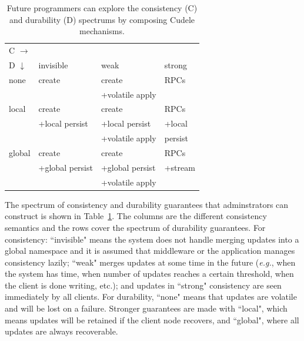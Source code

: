 \begin{table}[t]
\begin{center}
\caption{Future programmers can explore the consistency (C) and
durability (D) spectrums by composing Cudele mechanisms. 
\label{table:spectrum}}
\begin{tabular}{ l | l | l | l }
  C \(\rightarrow\) &&& \\  
  D \(\downarrow\)  	     & invisible         & weak        & strong  \\\hline
  none                       & create            & create          & RPCs    \\
                             &                   & +volatile apply &         \\\hdashline
  local                      & create            & create          & RPCs    \\
                             & +local persist    & +local persist  & +local  \\
                             &                   & +volatile apply &  persist\\\hdashline
  global                     & create            & create          & RPCs    \\
                             & +global persist   & +global persist & +stream \\
                             &                   & +volatile apply &         \\
\end{tabular}
\end{center}
\end{table}

The spectrum of consistency and durability guarantees that adminstrators can
construct is shown in Table~\ref{table:spectrum}. The columns are the different
consistency semantics and the rows cover the spectrum of durability guarantees.
For consistency: ``invisible" means the system does not handle merging updates
into a global namespace and it is assumed that middleware or the application
manages consistency lazily; ``weak" merges updates at some time in the
future ({\it e.g.}, when the system has time, when number of updates reaches a
certain threshold, when the client is done writing, etc.); and updates in
``strong" consistency are seen immediately by all clients. For durability,
``none" means that updates are volatile and will be lost on a failure. Stronger
guarantees are made with ``local", which means updates will be retained if the
client node recovers, and ``global", where all updates are always recoverable.

